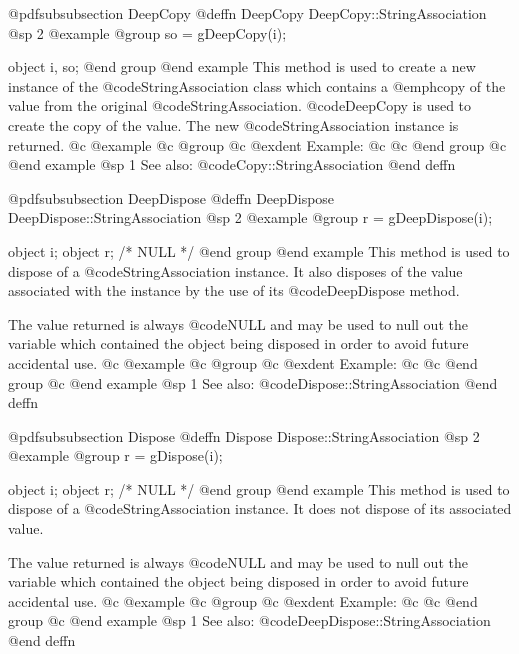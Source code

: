 @pdfsubsubsection {DeepCopy}
@deffn {DeepCopy} DeepCopy::StringAssociation
@sp 2
@example
@group
so = gDeepCopy(i);

object  i, so;
@end group
@end example
This method is used to create a new instance of the
@code{StringAssociation} class which contains a @emph{copy} of the
value from the original @code{StringAssociation}.  @code{DeepCopy} is
used to create the copy of the value.  The new
@code{StringAssociation} instance is returned.
@c @example
@c @group
@c @exdent Example:
@c 
@c @end group
@c @end example
@sp 1
See also:  @code{Copy::StringAssociation}
@end deffn








@pdfsubsubsection {DeepDispose}
@deffn {DeepDispose} DeepDispose::StringAssociation
@sp 2
@example
@group
r = gDeepDispose(i);

object  i;
object  r;     /*  NULL  */
@end group
@end example
This method is used to dispose of a @code{StringAssociation} instance.
It also disposes of the value associated with the instance by the
use of its @code{DeepDispose} method.

The value returned is always @code{NULL} and may be used to null out
the variable which contained the object being disposed in order to
avoid future accidental use.
@c @example
@c @group
@c @exdent Example:
@c 
@c @end group
@c @end example
@sp 1
See also:  @code{Dispose::StringAssociation}
@end deffn












@pdfsubsubsection {Dispose}
@deffn {Dispose} Dispose::StringAssociation
@sp 2
@example
@group
r = gDispose(i);

object  i;
object  r;     /*  NULL  */
@end group
@end example
This method is used to dispose of a @code{StringAssociation} instance.
It does not dispose of its associated value.

The value returned is always @code{NULL} and may be used to null out
the variable which contained the object being disposed in order to
avoid future accidental use.
@c @example
@c @group
@c @exdent Example:
@c 
@c @end group
@c @end example
@sp 1
See also:  @code{DeepDispose::StringAssociation}
@end deffn









